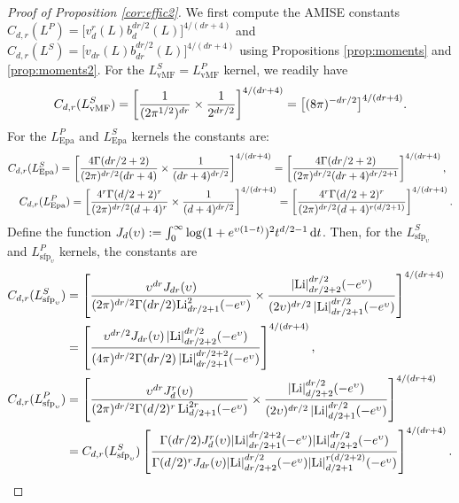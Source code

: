 \documentclass[oneside,11pt]{article}
\begin{document}
\begin{proof}[Proof of Proposition \ref{cor:effic2}]
We first compute the AMISE constants
$C_{d,r}(L^P)=%
\big[v^r_d(L)b^{dr/2}_d(L)\big]^{4/(dr+4)}$ and $C_{d,r}(L^S)=%
\big[v_{dr}(L) b_{dr}^{dr/2}(L)\big]^{4/(dr+4)}$ using Propositions \ref{prop:moments} and \ref{prop:moments2}. For the $L_\mathrm{vMF}^S=L_\mathrm{vMF}^P$ kernel, we readily have
\begin{align*}
    C_{d,r}(L_\mathrm{vMF}^S)=%
    \lrc{\frac{1}{(2\pi^{1/2})^{dr}} \times \frac{1}{2^{dr/2}}}^{4/(dr+4)}%
    =\big[(8\pi)^{-dr/2}\big]^{4/(dr+4)}.
\end{align*}
For the $L_\mathrm{Epa}^P$ and $L_\mathrm{Epa}^S$ kernels the constants are:
\begin{align*}
    C_{d,r}(L_\mathrm{Epa}^S)%
    =&\,\lrc{\frac{4\Gamma(dr/2+2)}{(2\pi)^{dr/2}(dr+4)} \times \frac{1}{(dr+4)^{dr/2}}}^{4/(dr+4)}
    =\lrc{\frac{4\Gamma(dr/2+2)}{(2\pi)^{dr/2}(dr+4)^{dr/2+1}}}^{4/(dr+4)},\\
    C_{d,r}(L_\mathrm{Epa}^P)%
    &=\lrc{\frac{4^r\Gamma(d/2+2)^r}{(2\pi)^{dr/2}(d+4)^{r}} \times \frac{1}{(d+4)^{dr/2}}}^{4/(dr+4)}
    =\lrc{\frac{4^r \Gamma(d/2+2)^r}{(2\pi)^{dr/2}(d+4)^{r(d/2+1)}}}^{4/(dr+4)}.
\end{align*}
Define the function $J_d(\upsilon):=\int_0^\infty \log(1+e^{\upsilon(1-t)})^2 t^{d/2-1} \,\mathrm{d} t$. Then, for the $L_{\mathrm{sfp}_\upsilon}^S$ and $L_{\mathrm{sfp}_\upsilon}^P$ kernels, the constants are
\begin{align*}
    C_{d,r}(L_{\mathrm{sfp}_\upsilon}^S)%
    &=\lrc{\frac{\upsilon^{dr}J_{dr}(\upsilon)}{(2\pi)^{dr/2}\Gamma(dr/2)\mathrm{Li}^2_{dr/2+1}(-e^\upsilon)} \times \frac{|\mathrm{Li}|^{dr/2}_{dr/2+2}(-e^\upsilon)}{(2\upsilon)^{dr/2}\,|\mathrm{Li}|^{dr/2}_{dr/2+1}(-e^\upsilon)}}^{4/(dr+4)}\\
    &=\lrc{\frac{\upsilon^{dr/2}J_{dr}(\upsilon) \,|\mathrm{Li}|_{dr/2+2}^{dr/2}(-e^\upsilon)}{(4\pi)^{dr/2}\Gamma(dr/2) \,|\mathrm{Li}|^{dr/2+2}_{dr/2+1}(-e^\upsilon)}}^{4/(dr+4)},\\
    C_{d,r}(L_{\mathrm{sfp}_\upsilon}^P)%
    &=\lrc{\frac{\upsilon^{dr}J_d^r(\upsilon)}{(2\pi)^{dr/2}\Gamma(d/2)^r\,\mathrm{Li}^{2r}_{d/2+1}(-e^\upsilon)}\times \frac{|\mathrm{Li}|_{d/2+2}^{dr/2}(-e^\upsilon)}{(2\upsilon)^{dr/2}\,|\mathrm{Li}|_{d/2+1}^{dr/2}(-e^\upsilon)}}^{4/(dr+4)}\\
    &=C_{d,r}(L_{\mathrm{sfp}_\upsilon}^S)\lrc{\frac{\Gamma(dr/2)J_d^r(\upsilon)|\mathrm{Li}|_{dr/2+1}^{dr/2+2}(-e^\upsilon)|\mathrm{Li}|_{d/2+2}^{dr/2}(-e^\upsilon)}{\Gamma(d/2)^rJ_{dr}(\upsilon)|\mathrm{Li}|_{dr/2+2}^{dr/2}(-e^\upsilon)|\mathrm{Li}|_{d/2+1}^{r(d/2+2)}(-e^\upsilon)}}^{4/(dr+4)}.
\end{align*}


\end{proof}
\end{document}
